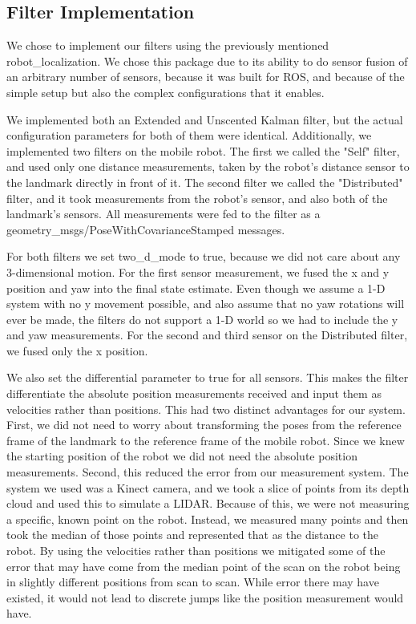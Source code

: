 \documentclass[conference]{IEEEtran}
\begin{document}
\subsection{Filter Implementation}
We chose to implement our filters using the previously mentioned robot\_localization. We chose this package due to its 
ability to do sensor fusion of an arbitrary number of sensors, because it was built for ROS, and because of the simple 
setup but also the complex configurations that it enables.

We implemented both an Extended and Unscented Kalman filter, but the actual configuration parameters for both of them 
were identical. Additionally, we implemented two filters on the mobile robot. The first we called the "Self" filter, 
and used only one distance measurements, taken by the robot's distance sensor to the landmark directly in front of it. 
The second filter we called the "Distributed" filter, and it took measurements from the robot's sensor, and also both 
of the landmark's sensors. All measurements were fed to the filter as a geometry\_msgs/PoseWithCovarianceStamped 
messages.

For both filters we set two\_d\_mode to true, because we did not care about any 3-dimensional motion. For the first 
sensor measurement, we fused the x and y position and yaw into the final state estimate. Even though we assume a 1-D 
system with no y movement possible, and also assume that no yaw rotations will ever be made, the filters do not support 
a 1-D world so we had to include the y and yaw measurements. For the second and third sensor on the Distributed filter, 
we fused only the x position.

We also set the differential parameter to true for all sensors. This makes the filter differentiate the absolute 
position measurements received and input them as velocities rather than positions. This had two distinct advantages for 
our system. First, we did not need to worry about transforming the poses from the reference frame of the landmark to 
the reference frame of the mobile robot. Since we knew the starting position of the robot we did not need the absolute 
position measurements. Second, this reduced the error from our measurement system. The system we used was a Kinect 
camera, and we took a slice of points from its depth cloud and used this to simulate a LIDAR. Because of this, we were 
not measuring a specific, known point on the robot. Instead, we measured many points and then took the median of those 
points and represented that as the distance to the robot. By using the velocities rather than positions we mitigated 
some of the error that may have come from the median point of the scan on the robot being in slightly different 
positions from scan to scan. While error there may have existed, it would not lead to discrete jumps like the position 
measurement would have.
\end{document}
